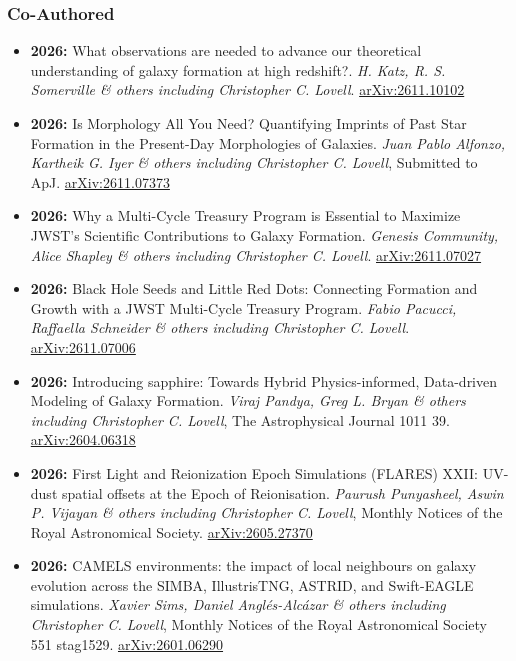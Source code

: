 \subsubsection*{Co-Authored}
\begin{itemize}
\item \textbf{2026:} What observations are needed to advance our theoretical understanding of galaxy formation at high redshift?. \textit{H. Katz, R. S. Somerville \& others including Christopher C. Lovell}. \href{https://arxiv.org/abs/2611.10102}{arXiv:2611.10102}
\item \textbf{2026:} Is Morphology All You Need? Quantifying Imprints of Past Star Formation in the Present-Day Morphologies of Galaxies. \textit{Juan Pablo Alfonzo, Kartheik G. Iyer \& others including Christopher C. Lovell}, Submitted to ApJ. \href{https://arxiv.org/abs/2611.07373}{arXiv:2611.07373}
\item \textbf{2026:} Why a Multi-Cycle Treasury Program is Essential to Maximize JWST's Scientific Contributions to Galaxy Formation. \textit{Genesis Community, Alice Shapley \& others including Christopher C. Lovell}. \href{https://arxiv.org/abs/2611.07027}{arXiv:2611.07027}
\item \textbf{2026:} Black Hole Seeds and Little Red Dots: Connecting Formation and Growth with a JWST Multi-Cycle Treasury Program. \textit{Fabio Pacucci, Raffaella Schneider \& others including Christopher C. Lovell}. \href{https://arxiv.org/abs/2611.07006}{arXiv:2611.07006}
\item \textbf{2026:} Introducing sapphire: Towards Hybrid Physics-informed, Data-driven Modeling of Galaxy Formation. \textit{Viraj Pandya, Greg L. Bryan \& others including Christopher C. Lovell}, The Astrophysical Journal 1011 39. \href{https://arxiv.org/abs/2604.06318}{arXiv:2604.06318}
\item \textbf{2026:} First Light and Reionization Epoch Simulations (FLARES) XXII: UV-dust spatial offsets at the Epoch of Reionisation. \textit{Paurush Punyasheel, Aswin P. Vijayan \& others including Christopher C. Lovell}, Monthly Notices of the Royal Astronomical Society. \href{https://arxiv.org/abs/2605.27370}{arXiv:2605.27370}
\item \textbf{2026:} CAMELS environments: the impact of local neighbours on galaxy evolution across the SIMBA, IllustrisTNG, ASTRID, and Swift-EAGLE simulations. \textit{Xavier Sims, Daniel Anglés-Alcázar \& others including Christopher C. Lovell}, Monthly Notices of the Royal Astronomical Society 551 stag1529. \href{https://arxiv.org/abs/2601.06290}{arXiv:2601.06290}

\end{itemize}
